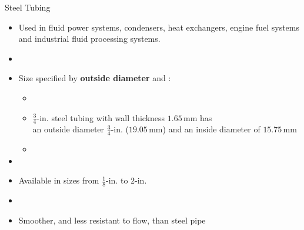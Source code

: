 \documentclass[9pt,xcolor={svgnames, x11names},professionalfonts, mathserif]{beamer}
\begin{document}
\begin{frame}{Steel Tubing}
	\begin{itemize}
		\item Used in fluid power systems, condensers, heat exchangers, engine fuel systems and
		      industrial fluid processing systems.
		\item[]
		\item Size specified by \textbf{outside diameter} and :
		      \begin{itemize}
		      	\item[]\item[] $\tfrac{3}{4}\text{-in.}$ steel tubing with wall thickness $1.65\,\text{mm}$ has \\an
		      	      outside diameter $\tfrac{3}{4}\text{-in.}$ ($19.05\,\text{mm}$) and an inside diameter of $15.75\,\text{mm}$
		      	\item[]
		      \end{itemize}
		\item[]
		\item Available in sizes from $\tfrac{1}{8}\text{-in.}$ to $2\text{-in.}$
		\item[]
		\item Smoother, and less resistant to flow, than steel pipe
	\end{itemize}
\end{frame}
\end{document}
